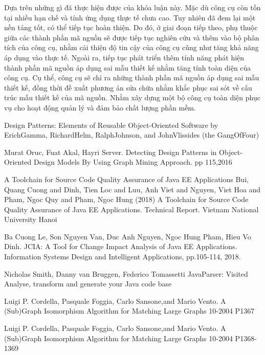 \documentclass[12pt]{report}
\begin{document}
\noindent Dựa trên những gì đã thực hiện được của khóa luận này. Mặc dù công cụ còn tồn tại nhiều hạn chế và tính ứng dụng thực tế chưa cao. Tuy nhiên đã đem lại một nền tảng tốt, có thể tiếp tục hoàn thiện. Do đó, ở giai đoạn tiếp theo, phụ thuộc giữa các thành phần mã nguồn sẽ được tiếp tục nghiên cứu và thêm vào bộ phân tích của công cụ, nhằm cải thiện độ tin cậy của công cụ cũng như tăng khả năng áp dụng vào thực tế. Ngoài ra, tiếp tục phát triển thêm tính năng phát hiện thành phần mã nguồn áp dụng sai mẫu thiết kế nhằm tăng tính toàn diện của công cụ. Cụ thể, công cụ sẽ chỉ ra những thành phần mã nguồn áp dụng sai mẫu thiết kế, đồng thời đề xuất phương án sửa chữa nhằm khắc phục sai sót về cấu trúc mẫu thiết kế của mã nguồn. Nhằm xây dựng một bộ công cụ toàn diện phục vụ cho hoạt động quản lý và đảm bảo chất lượng phần mềm.
\begin{thebibliography}{9}
	Design Patterns: Elements of Reusable Object-Oriented Software by ErichGamma, RichardHelm, RalphJohnson, and JohnVlissides (the GangOfFour)
	
	Murat Oruc, Fuat Akal, Hayri Server. Detecting Design Patterns in  Object-Oriented Design Models By Using Graph Mining Approach. pp 115,2016
	
	
	A Toolchain for Source Code Quality Assurance of Java EE Applications
	Bui, Quang Cuong and Dinh, Tien Loc and Luu, Anh Viet and Nguyen, Viet Hoa and Pham, Ngoc Quy and Pham, Ngoc Hung (2018) A Toolchain for Source Code Quality Assurance of Java EE Applications. Technical Report. Vietnam National University Hanoi
	

	Ba Cuong Le, Son Nguyen Van, Duc Anh Nguyen, Ngoc Hung Pham, Hieu Vo Dinh. JCIA: A Tool for Change Impact Analysis of Java EE Applications. Information Systems Design and Intelligent Applications, pp.105-114, 2018.
	
	Nicholas Smith, Danny van Bruggen, Federico Tomassetti
	JavaParser: Visited
	Analyse, transform and generate your Java code base
	
	Luigi P. Cordella, Pasquale Foggia, Carlo Sansone,and Mario Vento. A (Sub)Graph Isomorphism Algorithm for
	Matching Large Graphs 10-2004 P1367
	
	Luigi P. Cordella, Pasquale Foggia, Carlo Sansone,and Mario Vento. A (Sub)Graph Isomorphism Algorithm for
	Matching Large Graphs 10-2004 P1368-1369
\end{thebibliography}
\end{document}
